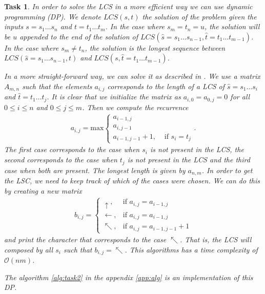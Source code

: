 \documentclass[11pt]{article} %
\theoremstyle{problemstyle}
\newtheorem{exercise}{Task}	%
\renewcommand*{\O}{\mathcal{O}}
\begin{document}
\begin{exercise}  %
In order to solve the LCS in a more efficient way we can use dynamic programming (DP). We denote $LCS(s,t)$ the solution of the problem given the inputs $s=s_1\dots s_n$ and $t=t_1\dots t_m$. In the case where $s_m = t_n = u$, the solution will be $u$ appended to the end of the solution of $LCS(\hat{s}=s_1\dots s_{n-1}, \hat{t}=t_1\dots t_{m-1})$. In the case where $s_m \neq t_n$, the solution is the longest sequence between $LCS(\hat{s}=s_1\dots s_{n-1}, t)$ and $LCS(s, \hat{t}=t_1\dots t_{m-1})$. 

In a more straight-forward way, we can solve it as described in \cite{jones}. We use a matrix $A_{m,n}$ such that the elements $a_{i,j}$ corresponds to the length of a LCS of $\hat{s}=s_1\dots s_{i}$ and $\hat{t}=t_1\dots t_{j}$. It is clear that we initialize the matrix as $a_{i,0} = a_{0,j} = 0$ for all $0\leq i \leq n$ and $0\leq j \leq m$. Then we compute the recurrence
\begin{align*}
		a_{i,j} = \text{max}
	\begin{cases}
	a_{i-1,j} &\\
	a_{i,j-1} &\\
	a_{i-1,j-1}+1, &\text{ if } s_i=t_j 
	\end{cases}
	\text{.}
\end{align*}
The first case corresponds to the case when $s_i$ is not present in the LCS, the second corresponds to the case when $t_j$ is not present in the LCS and the third case when both are present. The longest length is given by $a_{n,m}$. In order to get the LSC, we need to keep track of which of the cases were chosen. We can do this by creating a new matrix 
\begin{align*}
	b_{i,j} =
	\begin{cases}
	\uparrow, &\text{if } a_{i,j}=a_{i-1,j} \\
	\leftarrow, &\text{if } a_{i,j}=a_{i-1,j} \\
	\nwarrow, &\text{if } a_{i,j}=a_{i-1,j-1} +1
	\end{cases}
\end{align*}
and print the character that corresponds to the case $\nwarrow$. That is, the LCS will composed by all $s_i$ such that $b_{i,j}= \nwarrow$. This algorithms has a time complexity of $\O(nm)$.

The algorithm \ref{alg:task2} in the appendix \ref{app:alg} is an implementation of this DP.

\end{exercise}
\end{document}
